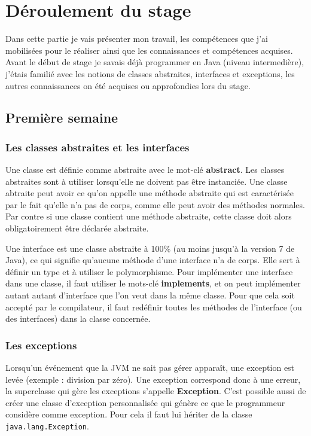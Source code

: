 \documentclass[12pt]{report}
\begin{document}
\newpage
\chapter{Déroulement du stage}

Dans cette partie je vais présenter mon travail, les compétences que j'ai mobilisées pour le réaliser ainsi que les connaissances et compétences acquises.
Avant le début de stage je savais déjà programmer en Java (niveau intermedière), j'étais familié avec les notions de classes abstraites, interfaces et exceptions, les autres connaissances on été acquises ou approfondies lors du stage.  

\section{Première semaine}

\subsection{Les classes abstraites et les interfaces}

Une classe est définie comme abstraite avec le mot-clé \textbf{abstract}. Les classes abstraites sont à utiliser lorsqu'elle ne doivent pas être instanciée. Une classe abtraite peut avoir ce qu'on appelle une méthode abstraite qui est caractérisée par le fait qu'elle n'a pas de corps, comme elle peut avoir des méthodes normales. Par contre si une classe contient une méthode abstraite, cette classe doit alors obligatoirement être déclarée abstraite.\newline

Une interface est une classe abstraite à 100\% (au moins jusqu'à la version 7 de Java), ce qui signifie qu'aucune méthode d'une interface n'a de corps. Elle sert à définir un type et à utiliser le polymorphisme. Pour implémenter une interface dans une classe, il faut utiliser le mots-clé \textbf{implements}, et on peut implémenter autant autant d'interface que l'on veut dans la même classe. Pour que cela soit accepté par le compilateur, il faut redéfinir toutes les méthodes de l'interface (ou des interfaces) dans la classe concernée.

\subsection{Les exceptions}
Lorsqu'un événement que la JVM ne sait pas gérer apparaît, une exception est levée (exemple : division par zéro). Une exception correspond donc à une erreur, la superclasse qui gère les exceptions s'appelle \textbf{Exception}. C'est possible aussi de créer une classe d'exception personnalisée qui génère ce que le programmeur considère comme exception. Pour cela il faut lui hériter de la classe \texttt{java.lang.Exception}.\newline
\end{document}
